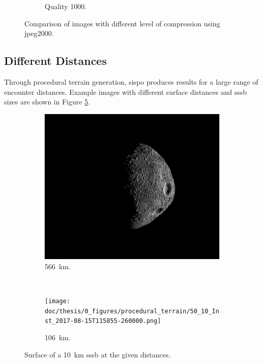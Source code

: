 \begin{figure}[htb]
\begin{subfigure}[b]{0.47\textwidth}
            \caption{Quality 1000.}
            \label{fig:img_quality_1000}
        \end{subfigure}
    \caption{Comparison of images with different level of compression using \gls{jpeg}2000.}
    \label{fig:img_quality_comp}
\end{figure}

\subsection{Different Distances}
Through procedural terrain generation, \gls{sispo} produces results for a large range of encounter distances. Example images with different surface distances and \gls{sssb} sizes are shown in Figure \ref{fig:img_procedural_10k}.

\begin{figure}[htb]
    \centering
        \begin{subfigure}[b]{0.75\textwidth}
            \centering
                \includegraphics[width=\textwidth]{doc/thesis/0_figures/procedural_terrain/50_10_Inst_2017-08-15T115755-845000.png}
            \caption{\SI{566}{\kilo\meter}.}
            \label{fig:img_procedural_500}
        \end{subfigure}
        \\
        \begin{subfigure}[b]{0.75\textwidth}
            \centering
                \texttt{[image: doc/thesis/0\_figures/procedural\_terrain/50\_10\_Inst\_2017-08-15T115855-260000.png]}
            \caption{\SI{106}{\kilo\meter}.}
            \label{fig:img_procedural_100}
        \end{subfigure}
    \caption{Surface of a \SI{10}{\kilo\meter} \gls{sssb} at the given distances.}
    \label{fig:img_procedural_10k}
\end{figure}

